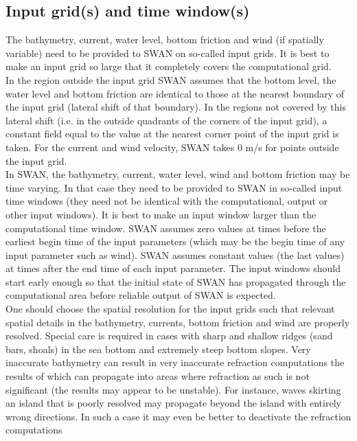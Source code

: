 \documentclass[12pt]{book}
\begin{document}
\subsection{Input grid(s) and time window(s)}
The bathymetry, current, water level, bottom friction and wind (if spatially variable) need to be provided to
SWAN on so-called input grids. It is best to make an input grid so large that it completely covers the
computational grid.
\\[2ex]
\noindent
In the region outside the input grid SWAN assumes that the bottom level, the water level and bottom
friction are identical to those at the nearest boundary of the input grid (lateral shift of that boundary).
In the regions not covered by this lateral shift (i.e. in the outside quadrants of the corners of the input
grid), a constant field equal to the value at the nearest corner point of the input grid is taken. For the
current and wind velocity, SWAN takes 0 m/s for points outside the input grid.
\\[2ex]
\noindent
In SWAN, the bathymetry, current, water level, wind and bottom friction may be time varying. In that case
they need to be provided to SWAN in so-called input time windows (they need not be identical with the
computational, output or other input windows). It is best to make an input window larger than the
computational time window. SWAN assumes zero values at times before the earliest begin time of the
input parameters (which may be the begin time of any input parameter such as wind). SWAN assumes
constant values (the last values) at times after the end time of each input parameter. The input windows
should start early enough so that the initial state of SWAN has propagated through the computational area
before reliable output of SWAN is expected.
\\[2ex]
\noindent
One should choose the spatial resolution for the input grids such that relevant spatial details in the
bathymetry, currents, bottom friction and wind are properly resolved. Special care is required in cases with
sharp and shallow ridges (sand bars, shoals) in the sea bottom and extremely steep bottom slopes. Very
inaccurate bathymetry can result in very inaccurate refraction computations the results of which can
propagate into areas where refraction as such is not significant (the results may appear to be unstable).
For instance, waves skirting an island that is poorly resolved may propagate beyond the island with
entirely wrong directions. In such a case it may even be better to deactivate the refraction computations
\end{document}
